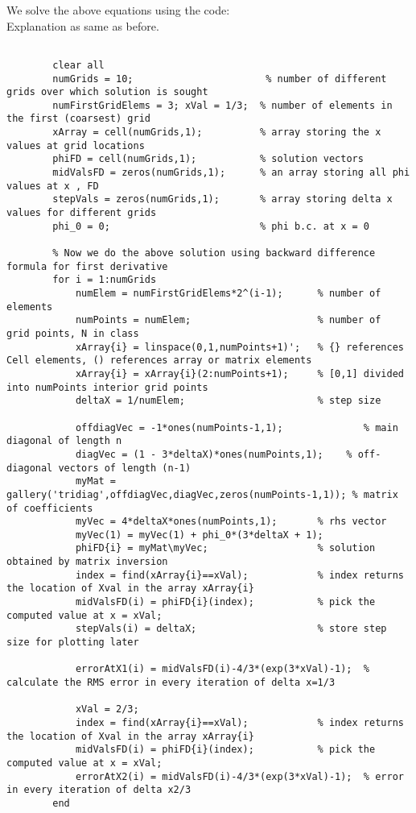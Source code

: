 \documentclass{article}
\begin{document}
     We solve the above equations using the code:\\
     Explanation as same as before.
    \begin{lstlisting}
                 
        clear all
        numGrids = 10;                       % number of different grids over which solution is sought
        numFirstGridElems = 3; xVal = 1/3;  % number of elements in the first (coarsest) grid
        xArray = cell(numGrids,1);          % array storing the x values at grid locations
        phiFD = cell(numGrids,1);           % solution vectors
        midValsFD = zeros(numGrids,1);      % an array storing all phi values at x , FD
        stepVals = zeros(numGrids,1);       % array storing delta x values for different grids
        phi_0 = 0;                          % phi b.c. at x = 0

        % Now we do the above solution using backward difference formula for first derivative
        for i = 1:numGrids
            numElem = numFirstGridElems*2^(i-1);      % number of elements
            numPoints = numElem;                      % number of  grid points, N in class
            xArray{i} = linspace(0,1,numPoints+1)';   % {} references Cell elements, () references array or matrix elements
            xArray{i} = xArray{i}(2:numPoints+1);     % [0,1] divided into numPoints interior grid points
            deltaX = 1/numElem;                       % step size

            offdiagVec = -1*ones(numPoints-1,1);              % main diagonal of length n
            diagVec = (1 - 3*deltaX)*ones(numPoints,1);    % off-diagonal vectors of length (n-1)
            myMat = gallery('tridiag',offdiagVec,diagVec,zeros(numPoints-1,1)); % matrix of coefficients
            myVec = 4*deltaX*ones(numPoints,1);       % rhs vector
            myVec(1) = myVec(1) + phi_0*(3*deltaX + 1);
            phiFD{i} = myMat\myVec;                   % solution obtained by matrix inversion
            index = find(xArray{i}==xVal);            % index returns the location of Xval in the array xArray{i}
            midValsFD(i) = phiFD{i}(index);           % pick the computed value at x = xVal; 
            stepVals(i) = deltaX;                     % store step size for plotting later

            errorAtX1(i) = midValsFD(i)-4/3*(exp(3*xVal)-1);  % calculate the RMS error in every iteration of delta x=1/3
            
            xVal = 2/3;
            index = find(xArray{i}==xVal);            % index returns the location of Xval in the array xArray{i}
            midValsFD(i) = phiFD{i}(index);           % pick the computed value at x = xVal; 
            errorAtX2(i) = midValsFD(i)-4/3*(exp(3*xVal)-1);  % error in every iteration of delta x2/3
        end


\end{lstlisting}
\end{document}
